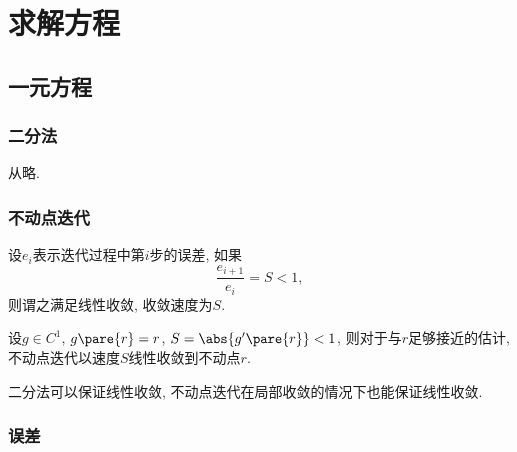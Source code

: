 \documentclass{ctexart}
\begin{document}
\section{求解方程} %
\label{sec:求解方程}

\subsection{一元方程} %
\label{sub:一元方程}

\subsubsection{二分法} %
\label{ssub:二分法}

从略.


\subsubsection{不动点迭代} %
\label{ssub:不动点迭代}

\begin{definition}
    设$e_i$表示迭代过程中第$i$步的误差, 如果
    \[ \frac{e_{i+1}}{e_i} = S < 1, \]
    则谓之满足线性收敛, 收敛速度为$S$.
\end{definition}
\begin{theorem}
    设$g\in C^1$, $g\pare{r} = r$, $S = \abs{g'\pare{r}}<1$, 则对于与$r$足够接近的估计, 不动点迭代以速度$S$线性收敛到不动点$r$.
\end{theorem}
\begin{remark}
    二分法可以保证线性收敛, 不动点迭代在局部收敛的情况下也能保证线性收敛.
\end{remark}


\subsubsection{误差} %
\label{ssub:误差}
\end{document}
